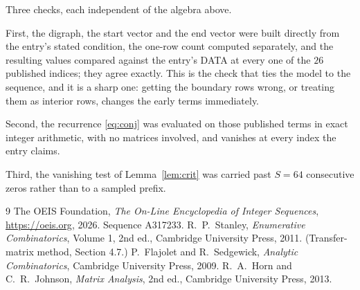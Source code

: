 \documentclass[11pt,a4paper]{article}
\theoremstyle{plain}
\theoremstyle{definition}
\begin{document}
Three checks, each independent of the algebra above.

First, the digraph, the start vector and the end vector were built directly from the
entry's stated condition, the one-row count computed separately, and the resulting values
compared against the entry's DATA at every one of the $26$ published indices; they
agree exactly. This is the check that ties the model to the sequence, and it is a sharp one:
getting the boundary rows wrong, or treating them as interior rows, changes the early terms
immediately.

Second, the recurrence \eqref{eq:conj} was evaluated on those published terms in exact
integer arithmetic, with no matrices involved, and vanishes at every index the entry claims.

Third, the vanishing test of Lemma~\ref{lem:crit} was carried past $S=64$ consecutive
zeros rather than to a sampled prefix.

\begin{thebibliography}{9}
 The OEIS Foundation, \emph{The On-Line Encyclopedia of Integer
Sequences}, \url{https://oeis.org}, 2026. Sequence A317233.
 R.~P.~Stanley, \emph{Enumerative Combinatorics}, Volume 1, 2nd ed.,
Cambridge University Press, 2011. (Transfer-matrix method, Section 4.7.)
 P.~Flajolet and R.~Sedgewick, \emph{Analytic Combinatorics}, Cambridge
University Press, 2009.
 R.~A.~Horn and C.~R.~Johnson, \emph{Matrix Analysis}, 2nd ed., Cambridge
University Press, 2013.
\end{thebibliography}
\end{document}
